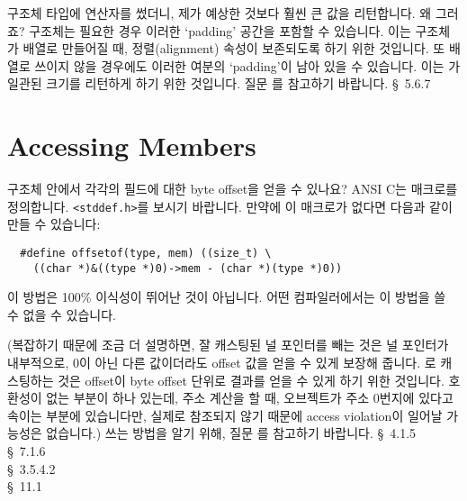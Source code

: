 \begin{faq}
	구조체 타입에  연산자를 썼더니, 제가 예상한 것보다
	훨씬 큰 값을 리턴합니다.  왜 그러죠?
\A
	구조체는 필요한 경우 이러한 `padding' 공간을 포함할 수 있습니다.
	이는 구조체가 배열로 만들어질 때, 정렬(alignment) 속성이 보존되도록
	하기 위한 것입니다.  또 배열로 쓰이지 않을 경우에도 이러한 여분의
	`padding'이 남아 있을 수 있습니다.  이는 가 일관된
	크기를 리턴하게 하기 위한 것입니다. 질문 를 참고하기 바랍니다.
\R
	\cite{hs} \S\ 5.6.7 
\end{faq}

\section{Accessing Members}

\begin{faq}
	구조체 안에서 각각의 필드에 대한 byte offset을 얻을 수 있나요?
\A
	ANSI C는  매크로를 정의합니다.  \verb+<stddef.h>+를 
	보시기 바랍니다.  만약에 이 매크로가 없다면 다음과 같이 만들 수
	있습니다:

\begin{verbatim}
  #define offsetof(type, mem) ((size_t) \
    ((char *)&((type *)0)->mem - (char *)(type *)0))
\end{verbatim}

	이 방법은 100\% 이식성이 뛰어난 것이 아닙니다.  어떤 컴파일러에서는 
	이 방법을 쓸 수 없을 수 있습니다.

        (복잡하기 때문에 조금 더 설명하면, 잘 캐스팅된 널 포인터를 빼는 것은
        널 포인터가 내부적으로, 0이 아닌 다른 값이더라도 offset 값을 얻을 수 있게
        보장해 줍니다. 로 캐스팅하는 것은 offset이 byte offset 단위로
        결과를 얻을 수 있게 하기 위한 것입니다.
        호환성이 없는 부분이 하나 있는데, 주소 계산을 할 때,  오브젝트가
        주소 0번지에 있다고 속이는 부분에 있습니다만, 실제로 참조되지 않기 때문에
        access violation이 일어날 가능성은 없습니다.)
        쓰는 방법을 알기 위해, 질문 를 참고하기 바랍니다.
\R
        \cite{ansi} \S\ 4.1.5 \\
	\cite{c89} \S\ 7.1.6 \\
	\cite{rationale} \S\ 3.5.4.2 \\
	\cite{hs} \S\ 11.1 
\end{faq}

